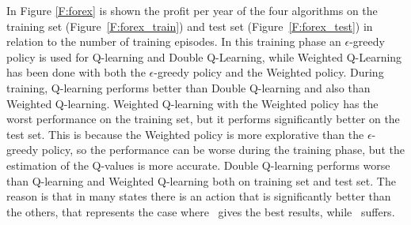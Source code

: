 In Figure \ref{F:forex} is shown the profit per year of the four algorithms on the training set (Figure~\ref{F:forex_train}) and test set (Figure~\ref{F:forex_test}) in relation to the number of training episodes. In this training phase an $\epsilon$-greedy policy is used for Q-learning and Double Q-Learning, while Weighted Q-Learning has been done with both the $\epsilon$-greedy policy and the Weighted policy.
During training, Q-learning performs better than Double Q-learning and also than Weighted Q-learning. Weighted Q-learning with the Weighted policy has the worst performance on the training set, but it performs significantly better on the test set. This is because the Weighted policy is more explorative than the $\epsilon$-greedy policy, so the performance can be worse during the training phase, but the estimation of the Q-values is more accurate.
Double Q-learning performs worse than Q-learning and Weighted Q-learning both on training set and test set. 
The reason is that in many states there is an action that is significantly better than the others, that represents the case where \ME~gives the best results, while \CV~suffers.
